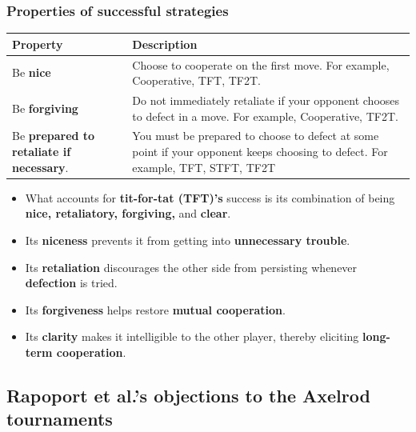 \documentclass[11pt]{article}
\begin{document}
\subsubsection{Properties of successful strategies}
\label{sec:orgcde1fa7}
\begin{center}
\begin{tabular}{|m{8em}|m{22em}|}
\hline
Property & Description\\
\hline
Be \textbf{nice} & Choose to cooperate on the first move. For example, Cooperative, TFT, TF2T.\\
\hline
Be \textbf{forgiving} & Do not immediately retaliate if your opponent chooses to defect in a move. For example, Cooperative, TF2T.\\
\hline
Be \textbf{prepared to retaliate if necessary}. & You must be prepared to choose to defect at some point if your opponent keeps choosing to defect. For example, TFT, STFT, TF2T\\
\hline
\end{tabular}
\end{center}
\begin{itemize}
\item What accounts for \textbf{tit-for-tat (TFT)'s} success is its combination of being \textbf{nice, retaliatory, forgiving,} and \textbf{clear}.
\item Its \textbf{niceness} prevents it from getting into \textbf{unnecessary trouble}.
\item Its \textbf{retaliation} discourages the other side from persisting whenever \textbf{defection} is tried.
\item Its \textbf{forgiveness} helps restore \textbf{mutual cooperation}.
\item Its \textbf{clarity} makes it intelligible to the other player, thereby eliciting \textbf{long-term cooperation}.
\end{itemize}

 \newpage
\subsection{Rapoport et al.'s objections to the Axelrod tournaments}
\label{sec:orgc824062}
\end{document}
